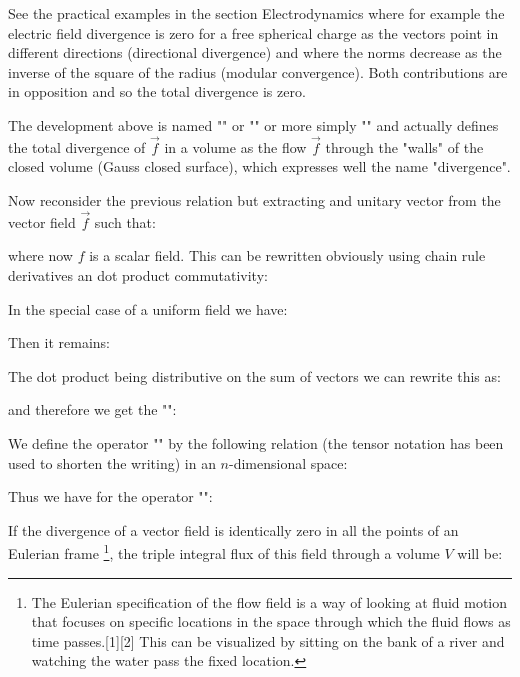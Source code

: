 	\begin{tcolorbox}[title=Remark,colframe=black,arc=10pt]
	See the practical examples in the section Electrodynamics where for example the electric field divergence is zero for a free spherical charge as the vectors point in different directions (directional divergence) and where the norms decrease as the inverse of the square of the radius (modular convergence). Both contributions are in opposition and so the total divergence is zero.
	\end{tcolorbox}
	The development above is named "" or "\label{gauss ostrogradsky theorem}" or more simply "" and actually defines the total divergence of $\vec{f}$ in a volume as the flow $\vec{f}$ through the "walls" of the closed volume (Gauss closed surface), which expresses well the name "divergence".
	
	Now reconsider the previous relation but extracting and unitary vector from the vector field $\vec{f}$ such that:
	
	where now $f$ is a scalar field. This can be rewritten obviously using chain rule derivatives an dot product commutativity:
	
	In the special case of a uniform field we have:
	
	Then it remains:
	
	The dot product being distributive on the sum of vectors we can rewrite this as:
	
	and therefore we get the "":
	
	
	We define the operator "" by the following relation (the tensor notation has been used to shorten the writing) in an $n$-dimensional space:
	
	Thus we have for the operator "":
	
	If the divergence of a vector field is identically zero in all the points of an Eulerian frame \footnote{The Eulerian specification of the flow field is a way of looking at fluid motion that focuses on specific locations in the space through which the fluid flows as time passes.[1][2] This can be visualized by sitting on the bank of a river and watching the water pass the fixed location.}, the triple integral flux of this field through a volume $V$ will be:
	
